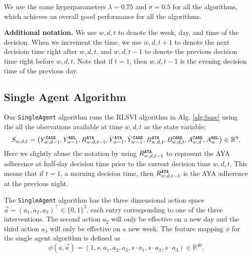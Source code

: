 We use the same hyperparameters $\lambda = 0.75$ and $\sigma = 0.5$ for all the algorithms, which achieves an overall good performance for all the algorithms.

\textbf{Additional notation.} We use $w, d, t$ to denote the week, day, and time of the decision. When we increment the time, we use $w, d, t+1$ to denote the next decisioin time right after $w, d, t$, and $w, d, t-1$ to denote the previous decision time right before $w, d, t$. Note that if $t = 1$, then $w, d, t-1$ is the evening decision time of the previous day.

\subsection{Single Agent Algorithm}

Our \texttt{SingleAgent} algorithm runs the RLSVI algorithm in Alg. \ref{alg:base} using the all the obervations available at time $w, d, t$ as the state variable:
$$
    S_{w, d, t} = 
    \left(Y_{w, d-1}^{\tiny\texttt{CARE}}, Y_{w-1}^{\tiny\texttt{REL}}, R_{w, d, t-1}^{\tiny\texttt{AYA}}, \bar{Y}_{w-1}^{\tiny\texttt{AYA}}, \bar{Y}_{w-1}^{\tiny\texttt{CARE}}, B_{w, d, t}^{\tiny\texttt{AYA}}, B_{w, d, t}^{\tiny\texttt{CARE}}, A_{w, d}^{\tiny\texttt{CARE}}, A_{w}^{\tiny\texttt{REL}}\right) \in \mathbb{R}^{9}.
$$
Here we slightly abuse the notation by using $R_{w, d, t-1}^{\tiny\texttt{AYA}}$ to represent the AYA adherence at half-day decision time prior to the current decision time $w, d, t$. This means that if $t = 1$, a morning decision time, then $R_{w, d, t-1}^{\tiny\texttt{AYA}}$ is the AYA adherence at the previous night.

The \texttt{SingleAgent} algorithm has the three dimensional action space $\vec{a} = (a_1, a_2, a_3)^{\top} \in \{0, 1\}^{3}$, each entry corresponding to one of the three interventions. The second action $a_2$  will only be effective on a new day and the third action $a_3$ will only be effective on a new week. The feature mapping $\phi$ for the single agent algorithm is defined as
$$
    \phi(s, \vec{a}) = (1, s, a_1, a_2, a_3, s \cdot a_1, s \cdot a_2, s \cdot a_3) \in \mathbb{R}^{40}.
$$

